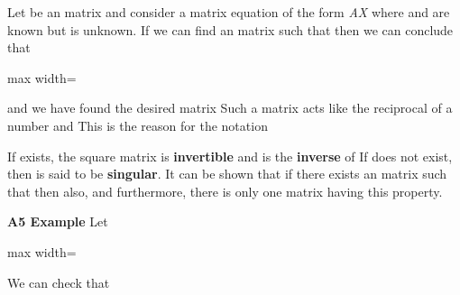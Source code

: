\documentclass[11pt,oneside]{article}
\begin{document}
\begin{BookBody}

Let  be an  matrix and consider a matrix equation of the form\textit{ AX}  where  and  are known but  is unknown. If we can find an  matrix  such that  then we can conclude that

\begin{center}\begin{adjustbox}{max width=\linewidth}\end{adjustbox}\end{center}

\noindent and we have found the desired matrix  Such a matrix  acts like the reciprocal of a number and  This is the reason for the notation 

If  exists, the square matrix  is\textbf{ invertible} and  is the\textbf{ inverse} of  If  does not exist, then  is said to be\textbf{ singular}. It can be shown that if there exists an  matrix  such that  then  also, and furthermore, there is only one matrix  having this property.

\noindent \textbf{A5 Example} Let

\begin{center}\begin{adjustbox}{max width=\linewidth}\end{adjustbox}\end{center}

\noindent We can check that


\end{BookBody}
\end{document}
